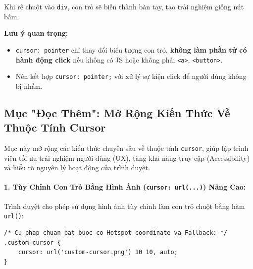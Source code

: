 \documentclass[11pt,oneside]{book}
\newcommand{\codeinline}[1]{\textcolor{accentOrange}{\texttt{#1}}}
\begin{document}
\begin{noteBox}
Khi rê chuột vào \codeinline{div}, con trỏ sẽ biến thành bàn tay, tạo trải nghiệm giống nút bấm.
\par\vspace{4pt}
\textbf{Lưu ý quan trọng:}
\begin{itemize}[leftmargin=1.5em, itemsep=3pt, parsep=0pt]
    \item \codeinline{cursor: pointer} chỉ thay đổi biểu tượng con trỏ, \textbf{không làm phần tử có hành động click} nếu không có JS hoặc không phải \codeinline{<a>}, \codeinline{<button>}.
    \item Nên kết hợp \codeinline{cursor: pointer;} với xử lý sự kiện click để người dùng không bị nhầm.
\end{itemize}
\end{noteBox}

\subsection{Mục "Đọc Thêm": Mở Rộng Kiến Thức Về Thuộc Tính Cursor}

\begin{conceptBox}
Mục này mở rộng các kiến thức chuyên sâu về thuộc tính \codeinline{cursor}, giúp lập trình viên tối ưu trải nghiệm người dùng (UX), tăng khả năng truy cập (Accessibility) và hiểu rõ nguyên lý hoạt động của trình duyệt.
\end{conceptBox}

\paragraph{1. Tùy Chỉnh Con Trỏ Bằng Hình Ảnh (\codeinline{cursor: url(...)}) Nâng Cao:}
Trình duyệt cho phép sử dụng hình ảnh tùy chỉnh làm con trỏ chuột bằng hàm \codeinline{url()}:

\begin{codeWindow}
\begin{lstlisting}[language=CSS3]
/* Cu phap chuan bat buoc co Hotspot coordinate va Fallback: */
.custom-cursor {
    cursor: url('custom-cursor.png') 10 10, auto;
}
\end{lstlisting}
\end{codeWindow}
\end{document}
